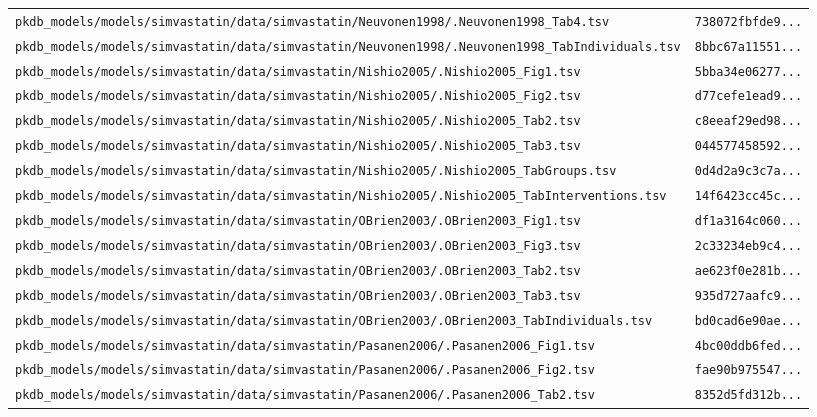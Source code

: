 \begin{longtable}{ll}
\texttt{pkdb\_models/models/simvastatin/data/simvastatin/Neuvonen1998/.Neuvonen1998\_Tab4.tsv} & \texttt{738072fbfde9...} \\
\texttt{pkdb\_models/models/simvastatin/data/simvastatin/Neuvonen1998/.Neuvonen1998\_TabIndividuals.tsv} & \texttt{8bbc67a11551...} \\
\texttt{pkdb\_models/models/simvastatin/data/simvastatin/Nishio2005/.Nishio2005\_Fig1.tsv} & \texttt{5bba34e06277...} \\
\texttt{pkdb\_models/models/simvastatin/data/simvastatin/Nishio2005/.Nishio2005\_Fig2.tsv} & \texttt{d77cefe1ead9...} \\
\texttt{pkdb\_models/models/simvastatin/data/simvastatin/Nishio2005/.Nishio2005\_Tab2.tsv} & \texttt{c8eeaf29ed98...} \\
\texttt{pkdb\_models/models/simvastatin/data/simvastatin/Nishio2005/.Nishio2005\_Tab3.tsv} & \texttt{044577458592...} \\
\texttt{pkdb\_models/models/simvastatin/data/simvastatin/Nishio2005/.Nishio2005\_TabGroups.tsv} & \texttt{0d4d2a9c3c7a...} \\
\texttt{pkdb\_models/models/simvastatin/data/simvastatin/Nishio2005/.Nishio2005\_TabInterventions.tsv} & \texttt{14f6423cc45c...} \\
\texttt{pkdb\_models/models/simvastatin/data/simvastatin/OBrien2003/.OBrien2003\_Fig1.tsv} & \texttt{df1a3164c060...} \\
\texttt{pkdb\_models/models/simvastatin/data/simvastatin/OBrien2003/.OBrien2003\_Fig3.tsv} & \texttt{2c33234eb9c4...} \\
\texttt{pkdb\_models/models/simvastatin/data/simvastatin/OBrien2003/.OBrien2003\_Tab2.tsv} & \texttt{ae623f0e281b...} \\
\texttt{pkdb\_models/models/simvastatin/data/simvastatin/OBrien2003/.OBrien2003\_Tab3.tsv} & \texttt{935d727aafc9...} \\
\texttt{pkdb\_models/models/simvastatin/data/simvastatin/OBrien2003/.OBrien2003\_TabIndividuals.tsv} & \texttt{bd0cad6e90ae...} \\
\texttt{pkdb\_models/models/simvastatin/data/simvastatin/Pasanen2006/.Pasanen2006\_Fig1.tsv} & \texttt{4bc00ddb6fed...} \\
\texttt{pkdb\_models/models/simvastatin/data/simvastatin/Pasanen2006/.Pasanen2006\_Fig2.tsv} & \texttt{fae90b975547...} \\
\texttt{pkdb\_models/models/simvastatin/data/simvastatin/Pasanen2006/.Pasanen2006\_Tab2.tsv} & \texttt{8352d5fd312b...} \\

\end{longtable}
